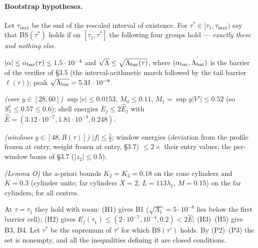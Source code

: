 \documentclass[11pt]{article}
\theoremstyle{definition}
\theoremstyle{remark}
\begin{document}
\paragraph{Bootstrap hypotheses.} Let $\tau_{\max}$ be the end of the rescaled interval of existence. For $\tau^\ast\in[\tau_1,\tau_{\max})$ say that $\mathrm{BS}(\tau^\ast)$ holds if on $[\tau_1,\tau^\ast]$ the following four groups hold --- \emph{exactly these and nothing else}.
\begin{description}[leftmargin=1.2em,labelindent=0pt]
\item[B1] $|\alpha|\le\alpha_{\rm bar}(\tau)\le1.5\cdot10^{-4}$ and $\sqrt\Lambda\le\sqrt{\Lambda_{\rm bar}(\tau)}$, where $(\alpha_{\rm bar},\Lambda_{\rm bar})$ is the barrier of the verifier of \S3.5 (the interval-arithmetic march followed by the tail barrier $\ell(\tau)$); peak $\sqrt{\Lambda_{\rm bar}}=5.31\cdot10^{-8}$.
\item[B2] \emph{(core $y\in[28,60]$)} $\sup|v|\le0.0153$, $M_0\le0.11$, $M_1=\sup y|V'|\le0.52$ (so $S_1^v\le0.57\le0.6$); shell energies $E_j\le2\hat E_j$ with $\hat E=(3.12\cdot10^{-7},1.81\cdot10^{-4},0.248)$.
\item[B3] \emph{(windows $y\in[48,R(\tau)]$)} $|f|\le\tfrac12$; window energies (deviation from the profile frozen at entry, weight frozen at entry, \S3.7) $\le2\times$ their entry values; the per-window boxes of \S3.7 ($|z_2|\le0.5$).
\item[B4] \emph{(Lemma O)} the a-priori bounds $K_2=K_3=0.18$ on the cone cylinders and $K=0.3$ (cylinder units; far cylinders $X=2$, $L=113\lambda_1$, $M=0.15$) on the far cylinders, for all centres.
\end{description}
At $\tau=\tau_1$ they hold with room: (H1) gives B1 ($\sqrt{\Lambda_1}=5\cdot10^{-8}$ lies below the first barrier cell); (H2) gives $E_j(\tau_1)\le(2\cdot10^{-7},10^{-4},0.2)<2\hat E$; (H3)--(H5) give B3, B4. Let $\tau^\ast$ be the supremum of $\tau'$ for which $\mathrm{BS}(\tau')$ holds. By (P2)--(P3) the set is nonempty, and all the inequalities defining it are closed conditions.
\end{document}
